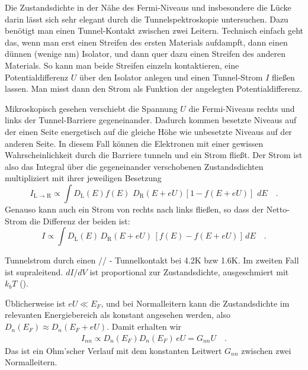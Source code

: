 Die Zustandsdichte in der Nähe des Fermi-Niveaus und insbesondere die Lücke darin lässt sich sehr elegant durch die Tunnelspektroskopie untersuchen. Dazu benötigt man einen Tunnel-Kontakt zwischen zwei Leitern. Technisch einfach geht das, wenn man erst einen Streifen des ersten Materials aufdampft, dann einen dünnen (wenige nm) Isolator, und dann quer dazu einen Streifen  des anderen Materials. So kann man beide Streifen einzeln kontaktieren, eine Potentialdifferenz $U$ über den Isolator anlegen und einen Tunnel-Strom $I$ fließen lassen. Man misst dann den Strom als Funktion der angelegten Potentialdifferenz.

Mikroskopisch gesehen verschiebt die Spannung $U$ die Fermi-Niveaus rechts und links der Tunnel-Barriere gegeneinander. Dadurch kommen besetzte Niveaus auf der einen Seite energetisch auf die gleiche Höhe wie unbesetzte Niveaus auf der anderen Seite. In diesem Fall können die Elektronen mit einer gewissen Wahrscheinlichkeit durch die Barriere tunneln und ein Strom fließt. Der Strom ist also das Integral über die gegeneinander verschobenen Zustandsdichten multipliziert mit ihrer jeweiligen Besetzung
\begin{equation}
    I_\text{L $\rightarrow$ R} \propto \int D_\text{L}(E) f(E) \, \, D_\text{R}(E + e U) [1 - f(E + e U)] \, \, dE \quad .
\end{equation}
Genauso kann auch ein Strom von rechts nach links fließen, so dass der Netto-Strom die Differenz der beiden ist:
\begin{equation}
    I \propto \int D_\text{L}(E) \, D_\text{R}(E + e U)  \, [f(E) - f(E + e U)] \, dE \quad .
\end{equation}

\begin{marginfigure}
    \caption{Tunnelstrom durch einen // - Tunnelkontakt bei 4.2K bzw 1.6K. Im zweiten Fall ist  supraleitend. $dI/dV$ ist proportional zur Zustandsdichte, ausgeschmiert mit $k_bT$
(\cite{Giaever1960}).}
\end{marginfigure}
  

Üblicherweise ist $eU \ll E_F$, und bei Normalleitern kann die Zustandsdichte  im relevanten Energiebereich als konstant angesehen werden, also $D_{n}(E_F)  \approx  D_{n}(E_F + e U)$. Damit erhalten wir
\begin{eqnarray}
    I_{nn} \propto D_{n}(E_F)  D_{n}(E_F) \, e U = G_{nn} U \quad .
\end{eqnarray}
Das ist ein Ohm'scher Verlauf mit dem konstanten Leitwert $G_{nn}$ zwischen zwei Normalleitern.

